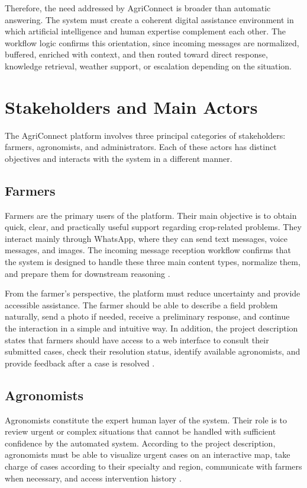 Therefore, the need addressed by AgriConnect is broader than automatic answering. The system must create a coherent digital assistance environment in which artificial intelligence and human expertise complement each other. The workflow logic confirms this orientation, since incoming messages are normalized, buffered, enriched with context, and then routed toward direct response, knowledge retrieval, weather support, or escalation depending on the situation. 

\section{Stakeholders and Main Actors}

The AgriConnect platform involves three principal categories of stakeholders: farmers, agronomists, and administrators. Each of these actors has distinct objectives and interacts with the system in a different manner.

\subsection{Farmers}

Farmers are the primary users of the platform. Their main objective is to obtain quick, clear, and practically useful support regarding crop-related problems. They interact mainly through WhatsApp, where they can send text messages, voice messages, and images. The incoming message reception workflow confirms that the system is designed to handle these three main content types, normalize them, and prepare them for downstream reasoning \cite{anrt2025,zhu2025vlm}.

From the farmer's perspective, the platform must reduce uncertainty and provide accessible assistance. The farmer should be able to describe a field problem naturally, send a photo if needed, receive a preliminary response, and continue the interaction in a simple and intuitive way. In addition, the project description states that farmers should have access to a web interface to consult their submitted cases, check their resolution status, identify available agronomists, and provide feedback after a case is resolved \cite{li2025llm}.

\subsection{Agronomists}

Agronomists constitute the expert human layer of the system. Their role is to review urgent or complex situations that cannot be handled with sufficient confidence by the automated system. According to the project description, agronomists must be able to visualize urgent cases on an interactive map, take charge of cases according to their specialty and region, communicate with farmers when necessary, and access intervention history \cite{li2025llm,yin2025foundation}.

